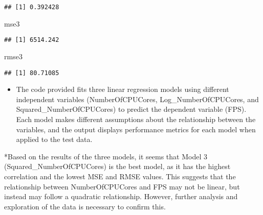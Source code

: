 \documentclass[
]{article}
\newenvironment{Shaded}{\begin{snugshade}}{\end{snugshade}}
\newcommand{\NormalTok}[1]{#1}
\providecommand{\tightlist}{%
  \setlength{\itemsep}{0pt}\setlength{\parskip}{0pt}}
\begin{document}
\begin{verbatim}
## [1] 0.392428
\end{verbatim}

\begin{Shaded}
\begin{Highlighting}[]
\NormalTok{mse3}
\end{Highlighting}
\end{Shaded}

\begin{verbatim}
## [1] 6514.242
\end{verbatim}

\begin{Shaded}
\begin{Highlighting}[]
\NormalTok{rmse3}
\end{Highlighting}
\end{Shaded}

\begin{verbatim}
## [1] 80.71085
\end{verbatim}

\begin{itemize}
\tightlist
\item
  The code provided fits three linear regression models using different
  independent variables (NumberOfCPUCores, Log\_NumberOfCPUCores, and
  Squared\_NumberOfCPUCores) to predict the dependent variable (FPS).
  Each model makes different assumptions about the relationship between
  the variables, and the output displays performance metrics for each
  model when applied to the test data.
\end{itemize}

*Based on the results of the three models, it seems that Model 3
(Squared\_NumberOfCPUCores) is the best model, as it has the highest
correlation and the lowest MSE and RMSE values. This suggests that the
relationship between NumberOfCPUCores and FPS may not be linear, but
instead may follow a quadratic relationship. However, further analysis
and exploration of the data is necessary to confirm this.
\end{document}
